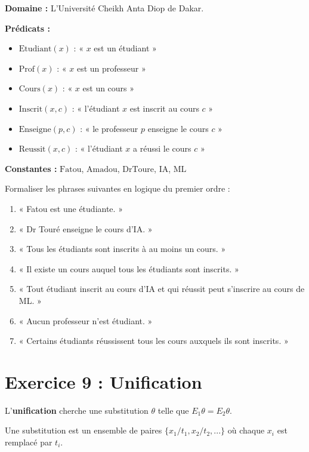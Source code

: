 \documentclass[11pt,a4paper]{article}
\begin{document}
\begin{exercice}
\textbf{Domaine :} L'Université Cheikh Anta Diop de Dakar.

\textbf{Prédicats :}
\begin{itemize}
    \item $\text{Etudiant}(x)$ : « $x$ est un étudiant »
    \item $\text{Prof}(x)$ : « $x$ est un professeur »
    \item $\text{Cours}(x)$ : « $x$ est un cours »
    \item $\text{Inscrit}(x, c)$ : « l'étudiant $x$ est inscrit au cours $c$ »
    \item $\text{Enseigne}(p, c)$ : « le professeur $p$ enseigne le cours $c$ »
    \item $\text{Reussit}(x, c)$ : « l'étudiant $x$ a réussi le cours $c$ »
\end{itemize}

\textbf{Constantes :} $\text{Fatou}$, $\text{Amadou}$, $\text{DrToure}$, $\text{IA}$, $\text{ML}$

Formaliser les phrases suivantes en logique du premier ordre :

\begin{enumerate}
    \item « Fatou est une étudiante. »
    \item « Dr Touré enseigne le cours d'IA. »
    \item « Tous les étudiants sont inscrits à au moins un cours. »
    \item « Il existe un cours auquel tous les étudiants sont inscrits. »
    \item « Tout étudiant inscrit au cours d'IA et qui réussit peut s'inscrire au cours de ML. »
    \item « Aucun professeur n'est étudiant. »
    \item « Certains étudiants réussissent tous les cours auxquels ils sont inscrits. »
\end{enumerate}
\end{exercice}

\section*{Exercice 9 : Unification}

\begin{rappelbox}[Unification]
L'\textbf{unification} cherche une substitution $\theta$ telle que $E_1\theta = E_2\theta$.

Une substitution est un ensemble de paires $\{x_1/t_1, x_2/t_2, ...\}$ où chaque $x_i$ est remplacé par $t_i$.
\end{rappelbox}
\end{document}

